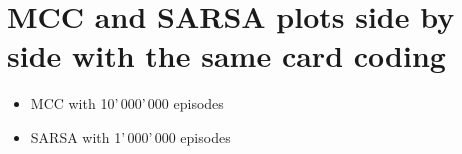 
\chapter{MCC and SARSA plots side by side with the same card coding} %

\label{MCC and SARSA plots side by side with the same card coding} %

\begin{itemize}
    \item MCC with 10'\,000'\,000 episodes
    \item SARSA with 1'\,000'\,000 episodes
\end{itemize}

\vspace{2cm}

